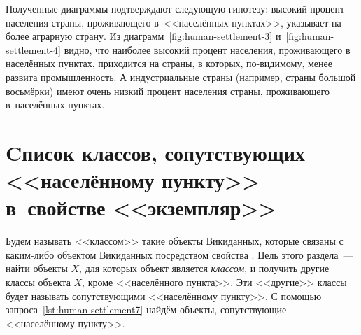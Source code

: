 
Полученные диаграммы подтверждают следующую гипотезу: 
высокий процент населения страны, проживающего в~<<населённых пунктах>>, 
указывает на более аграрную страну. 
Из диаграмм~\ref{fig:human-settlement-3} и~\ref{fig:human-settlement-4} видно, 
что наиболее высокий процент населения, проживающего в населённых пунктах, 
приходится на страны, в которых, по-видимому, менее развита промышленность. 
А индустриальные страны (например, страны большой восьмёрки) имеют очень низкий процент населения страны, 
проживающего в~населённых пунктах.




\section[Cписок классов, сопутствующих <<населённому пункту>> в~свойстве <<экземпляр>>]{Cписок классов, сопутствующих <<населённому пункту>>\\в~свойстве <<экземпляр>>}
\label{human-settlement:tag1}

Будем называть <<классом>> такие объекты Викиданных, 
которые связаны с каким-либо объектом Викиданных посредством свойства . 
Цель этого раздела~--- найти объекты $X$, 
для которых объект  является \emph{классом}, 
и получить другие классы объекта $X$, кроме <<населённого пункта>>. 
Эти <<другие>> классы будет называть сопутствующими <<населённому пункту>>. 
С помощью запроса~\ref{lst:human-settlement7} 
найдём объекты, сопутствующие <<населённому пункту>>. 



